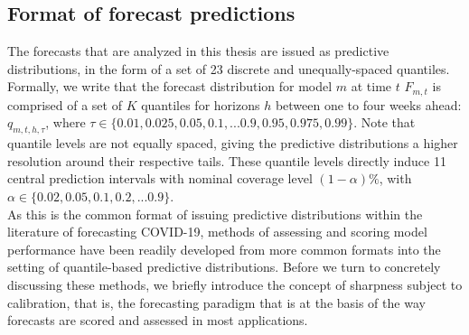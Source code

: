\subsection{Format of forecast predictions}
The forecasts that are analyzed in this thesis are issued as predictive distributions, in the form of a set of 23 discrete and unequally-spaced quantiles. Formally, we write that the forecast distribution for model $m$ at time $t$ $F_{m,t}$ is comprised of a set of $K$ quantiles for horizons $h$ between one to four weeks ahead: $q_{m, t, h, \tau}$, where $\tau \in \{0.01, 0.025, 0.05, 0.1, ... 0.9, 0.95, 0.975, 0.99\} $. Note that quantile levels are not equally spaced, giving the predictive distributions a higher resolution around their respective tails. These quantile levels directly induce 11 central prediction intervals with nominal coverage level $(1-\alpha)\%$, with $\alpha \in \{0.02, 0.05, 0.1, 0.2, ... 0.9\}$.\\
As this is the common format of issuing predictive distributions within the literature of forecasting COVID-19, methods of assessing and scoring model performance have been readily developed from more common formats into the setting of quantile-based predictive distributions. Before we turn to concretely discussing these methods, we briefly introduce the concept of sharpness subject to calibration, that is, the forecasting paradigm that is at the basis of the way forecasts are scored and assessed in most applications.
